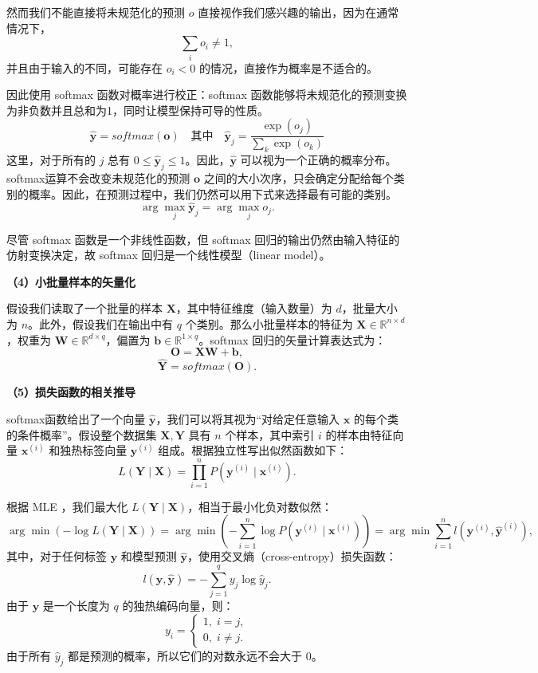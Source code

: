\documentclass[UTF8]{ctexart}
\begin{document}
	然而我们不能直接将未规范化的预测 $o$ 直接视作我们感兴趣的输出，因为在通常情况下，
	\[
	\sum_i o_i \neq 1,
	\]
	并且由于输入的不同，可能存在 $o_i< 0$ 的情况，直接作为概率是不适合的。
	
	因此使用 softmax 函数对概率进行校正：softmax 函数能够将未规范化的预测变换为非负数并且总和为1，同时让模型保持可导的性质。
	$$
	\hat{\bm{y}} = softmax(\bm{o}) \quad \text{其中} \quad \hat{\bm{y}}_j =  \frac{\exp(o_j)}{\displaystyle\sum_k \exp(o_k)}
	$$
	这里，对于所有的 $j$ 总有 $0 \leq \hat{\bm{y}}_j \leq 1$。因此，$\hat{\bm{y}}$ 可以视为一个正确的概率分布。softmax运算不会改变未规范化的预测 $\bm{o}$ 之间的大小次序，只会确定分配给每个类别的概率。因此，在预测过程中，我们仍然可以用下式来选择最有可能的类别。
	$$
	\arg \max_j \hat{\bm{y}}_j = \arg \max_j o_j.
	$$
	
	尽管 softmax 函数是一个非线性函数，但 softmax 回归的输出仍然由输入特征的仿射变换决定，故 softmax 回归是一个线性模型（linear model）。
	
	\textbf{（4）小批量样本的矢量化}
	
	假设我们读取了一个批量的样本 $\bm{X}$，其中特征维度（输入数量）为 $d$，批量大小为 $n$。此外，假设我们在输出中有 $q$ 个类别。那么小批量样本的特征为 $\bm{X} \in \mathbb{R}^{n \times d}$，权重为 $\bm{W} \in \mathbb{R}^{d \times q}$，偏置为 $\bm{b} \in \mathbb{R}^{1 \times q}$。softmax 回归的矢量计算表达式为：
	$$
	\bm{O} = \bm{X} \bm{W} + \bm{b},
	$$
	$$
	\hat{\bm{Y}} = softmax(\bm{O}).
	$$
	
	\textbf{（5）损失函数的相关推导}
	
	softmax函数给出了一个向量 $\hat{\bm{y}}$，我们可以将其视为“对给定任意输入 $\bm{x}$ 的每个类的条件概率”。假设整个数据集 $\bm{X}, \bm{Y}$ 具有 $n$ 个样本，其中索引 $i$ 的样本由特征向量 $\bm{x}^{(i)}$ 和独热标签向量 $\bm{y}^{(i)}$ 组成。根据独立性写出似然函数如下：
	\[
	L(\bm{Y} \mid \bm{X}) = \prod_{i=1}^n P(\bm{y}^{(i)} \mid \bm{x}^{(i)}).
	\]
	
	根据 MLE ，我们最大化 $L(\bm{Y} \mid \bm{X})$，相当于最小化负对数似然：
	\[
	\arg \min \left( -\log L(\bm{Y} \mid \bm{X})\right) 
	= \arg \min \left( - \sum_{i=1}^n \log P(\bm{y}^{(i)} \mid \bm{x}^{(i)}) \right) 
	= \arg \min \sum_{i=1}^n l(\bm{y}^{(i)}, \hat{\bm{y}}^{(i)}) ,
	\]
	其中，对于任何标签 $\bm{y}$ 和模型预测 $\hat{\bm{y}}$，使用交叉熵（cross-entropy）损失函数：
	\[
	l(\bm{y}, \hat{\bm{y}}) = -\sum_{j=1}^q y_j \log \hat{y}_j .
	\]
	由于 $\bm{y}$ 是一个长度为 $q$ 的独热编码向量，则：
	\[
	y_i=
	\begin{cases}
		1,\; i=j,\\
		0,\; i \neq j.
	\end{cases}
	\]
	由于所有 $\hat{y}_j$ 都是预测的概率，所以它们的对数永远不会大于 0。
	
\end{document}
